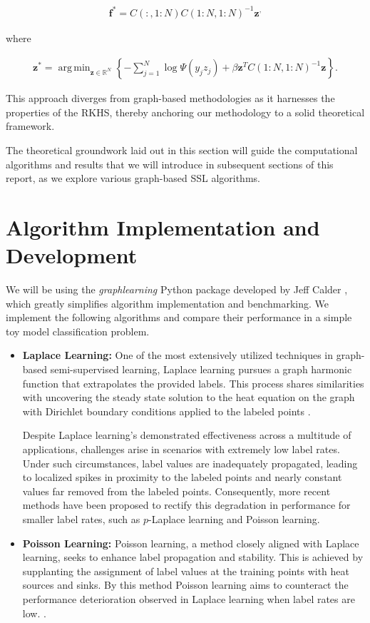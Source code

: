 \documentclass[11pt]{amsart}
\begin{document}
\begin{align*}
\mathbf f^* = C(:, 1:N)C(1:N, 1:N)^{-1}\mathbf z^,
\end{align*}

where

\begin{align*}
\mathbf z^* = \operatorname{arg\,min}_{\mathbf z \in \mathbb R^N} \left\{-\sum_{j=1}^N \log \Psi (y_j z_j) + \beta \mathbf z^T C(1:N, 1:N)^{-1} \mathbf z \right\}.
\end{align*}

This approach diverges from graph-based methodologies as it harnesses the properties of the RKHS, thereby anchoring our methodology to a solid theoretical framework.

The theoretical groundwork laid out in this section will guide the computational algorithms and results that we will introduce in subsequent sections of this report, as we explore various graph-based SSL algorithms. 

\section{Algorithm Implementation and Development}

We will be using the \textit{graphlearning} Python package developed by Jeff Calder \cite{graphlearning}, which greatly simplifies algorithm implementation and benchmarking. We implement the following algorithms and compare their performance in a simple toy model classification problem.  

\begin{itemize}
    \item \textbf{Laplace Learning:} One of the most extensively utilized techniques in graph-based semi-supervised learning, Laplace learning pursues a graph harmonic function that extrapolates the provided labels. This process shares similarities with uncovering the steady state solution to the heat equation on the graph with Dirichlet boundary conditions applied to the labeled points \cite{pmlr-v119-calder20a}.

    Despite Laplace learning's demonstrated effectiveness across a multitude of applications, challenges arise in scenarios with extremely low label rates. Under such circumstances, label values are inadequately propagated, leading to localized spikes in proximity to the labeled points and nearly constant values far removed from the labeled points. Consequently, more recent methods have been proposed to rectify this degradation in performance for smaller label rates, such as $p$-Laplace learning and Poisson learning. \cite{pmlr-v119-calder20a}

    \item \textbf{Poisson Learning:} Poisson learning, a method closely aligned with Laplace learning, seeks to enhance label propagation and stability. This is achieved by supplanting the assignment of label values at the training points with heat sources and sinks. By this method Poisson learning aims to counteract the performance deterioration observed in Laplace learning when label rates are low. \cite{pmlr-v119-calder20a}.
\end{itemize}
\end{document}
